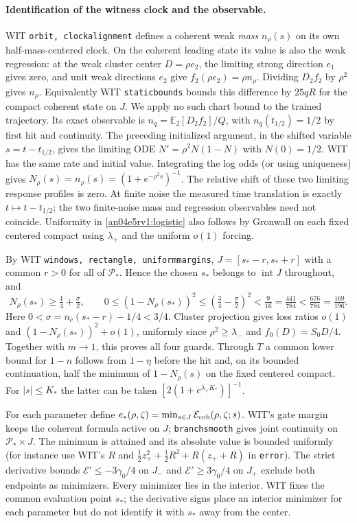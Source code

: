 \documentclass[11pt]{article}
\newcommand{\E}{\mathbb E}
\begin{document}
\paragraph{Identification of the witness clock and the observable.}
WIT \texttt{orbit, clockalignment} defines a coherent weak \emph{mass} $n_\rho(s)$ on its own half-mass-centered clock. On the coherent leading state its value is also the weak regression: at the weak cluster center $D=\rho e_2$, the limiting strong direction $e_1$ gives zero, and unit weak directions $e_2$ give $f_2(\rho e_2)=\rho n_\rho$. Dividing $D_2f_2$ by $\rho^2$ gives $n_\rho$. Equivalently WIT \texttt{staticbounds} bounds this difference by $25qR$ for the compact coherent state on $J$. We apply no such chart bound to the trained trajectory. Its exact observable is $n_q=\E_2[D_2 f_2]/Q$, with $n_q(t_{1/2})=1/2$ by first hit and continuity. The preceding initialized argument, in the shifted variable $s=t-t_{1/2}$, gives the limiting ODE $N'=\rho^2 N(1-N)$ with $N(0)=1/2$. WIT has the same rate and initial value. Integrating the log odds (or using uniqueness) gives $N_\rho(s)=n_\rho(s)=(1+e^{-\rho^2 s})^{-1}$. The relative shift of these two limiting response profiles is zero. At finite noise the measured time translation is exactly $t\mapsto t-t_{1/2}$; the two finite-noise mass and regression observables need not coincide. Uniformity in \eqref{an04e5rv1:logistic} also follows by Gronwall on each fixed centered compact using $\lambda_+$ and the uniform $o(1)$ forcing.

By WIT \texttt{windows, rectangle, uniformmargins}, $J=[s_*-r,s_*+r]$ with a common $r>0$ for all of $\mathcal P_*$. Hence the chosen $s_*$ belongs to $\operatorname{int}J$ throughout, and
\begin{equation}\label{an04e5rv1:witness}
 N_\rho(s_*)\ge\tfrac14+\tfrac\sigma2,\qquad
 0\le(1-N_\rho(s_*))^2\le(\tfrac34-\tfrac\sigma2)^2
 <\tfrac9{16}=\tfrac{441}{784}<\tfrac{676}{784}=\tfrac{169}{196}.
\end{equation}
Here $0<\sigma=n_c(s_*-r)-1/4<3/4$. Cluster projection gives loss ratios $o(1)$ and $(1-N_\rho(s_*))^2+o(1)$, uniformly since $\rho^2\ge\lambda_-$ and $f_0(D)=S_0D/4$. Together with $m\to1$, this proves all four guards. Through $T$ a common lower bound for $1-n$ follows from $1-\eta$ before the hit and, on its bounded continuation, half the minimum of $1-N_\rho(s)$ on the fixed centered compact. For $|s|\le K_*$ the latter can be taken $[2(1+e^{\lambda_+K_*})]^{-1}$.

For each parameter define $e_*(\rho,\zeta)=\min_{s\in J}\mathcal E_{\rm coh}(\rho,\zeta;s)$. WIT's gate margin keeps the coherent formula active on $J$; \texttt{branchsmooth} gives joint continuity on $\mathcal P_*\times J$. The minimum is attained and its absolute value is bounded uniformly (for instance use WIT's $R$ and $\tfrac12 z_+^2+\tfrac12 R^2+R(z_++R)$ in \texttt{error}). The strict derivative bounds $\mathcal E'\le-3\gamma_0/4$ on $J_-$ and $\mathcal E'\ge3\gamma_0/4$ on $J_+$ exclude both endpoints as minimizers. Every minimizer lies in the interior. WIT fixes the common evaluation point $s_*$; the derivative signs place an interior minimizer for each parameter but do not identify it with $s_*$ away from the center.
\end{document}
